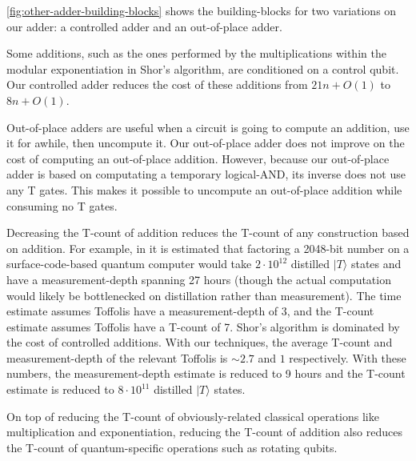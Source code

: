 \documentclass[twocolumn]{quantumarticle-customized}
\begin{document}
\autoref{fig:other-adder-building-blocks} shows the building-blocks for two variations on our adder: a controlled adder and an out-of-place adder.

Some additions, such as the ones performed by the multiplications within the modular exponentiation in Shor's algorithm, are conditioned on a control qubit.
Our controlled adder reduces the cost of these additions from $21n + O(1)$ \cite{Coreas2017} to $8n + O(1)$.

Out-of-place adders are useful when a circuit is going to compute an addition, use it for awhile, then uncompute it.
Our out-of-place adder does not improve on the cost of computing an out-of-place addition.
However, because our out-of-place adder is based on computating a temporary logical-AND, its inverse does not use any T gates.
This makes it possible to uncompute an out-of-place addition while consuming no T gates.

Decreasing the T-count of addition reduces the T-count of any construction based on addition.
For example, in \cite{Fowler2012} it is estimated that factoring a 2048-bit number on a surface-code-based quantum computer would take $2 \cdot 10^{12}$ distilled $|T\rangle$ states and have a measurement-depth spanning 27 hours (though the actual computation would likely be bottlenecked on distillation rather than measurement).
The time estimate assumes Toffolis have a measurement-depth of 3, and the T-count estimate assumes Toffolis have a T-count of 7.
Shor's algorithm is dominated by the cost of controlled additions.
With our techniques, the average T-count and measurement-depth of the relevant Toffolis is $\sim 2.7$ and $1$ respectively.
With these numbers, the measurement-depth estimate is reduced to 9 hours and the T-count estimate is reduced to $8 \cdot 10^{11}$ distilled $|T\rangle$ states.

On top of reducing the T-count of obviously-related classical operations like multiplication and exponentiation, reducing the T-count of addition also reduces the T-count of quantum-specific operations such as rotating qubits.
\end{document}
